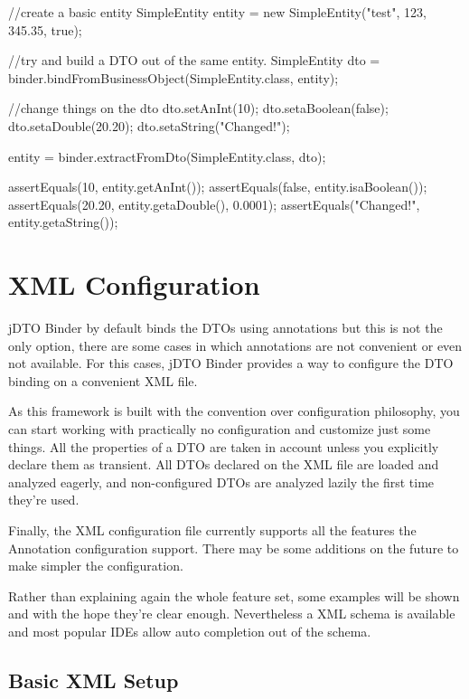 \documentclass[11pt]{article}
\newcommand{\JDTO}{jDTO Binder\xspace}
\begin{document}
\begin{java}
//create a basic entity
SimpleEntity entity = new SimpleEntity("test", 123, 345.35, true);

//try and build a DTO out of the same entity.
SimpleEntity dto = 
    binder.bindFromBusinessObject(SimpleEntity.class, entity);

//change things on the dto
dto.setAnInt(10);
dto.setaBoolean(false);
dto.setaDouble(20.20);
dto.setaString("Changed!");

entity = binder.extractFromDto(SimpleEntity.class, dto);


assertEquals(10, entity.getAnInt());
assertEquals(false, entity.isaBoolean());
assertEquals(20.20, entity.getaDouble(), 0.0001);
assertEquals("Changed!", entity.getaString());
\end{java}



\section{XML Configuration}

\JDTO by default binds the DTOs using annotations but this is not the only option, there are some cases in which annotations are not convenient or even not available. For this cases, \JDTO provides a way to configure the DTO binding on a convenient XML file.

As this framework is built with the convention over configuration philosophy, you can start working with practically no configuration and customize just some things. All the properties of a DTO are taken in account unless you explicitly declare them as transient. All DTOs declared on the XML file are loaded and analyzed eagerly, and non-configured DTOs are analyzed lazily the first time they're used.


Finally, the XML configuration file currently supports all the features the Annotation configuration support. There may be some additions on the future to make simpler the configuration.


Rather than explaining again the whole feature set, some examples will be shown and with the hope they're clear enough. Nevertheless a XML schema is available and most popular IDEs allow auto completion out of the schema.


\subsection{Basic XML Setup}
\end{document}
